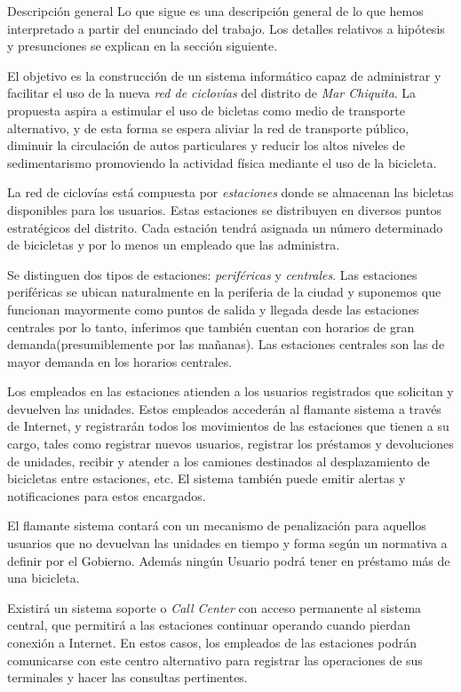  
%
%

\begin{subsection}{Descripción general}
Lo que sigue es una descripción general de lo que hemos interpretado a partir del enunciado del trabajo. Los detalles relativos a hipótesis y presunciones se explican en la sección siguiente.

El objetivo es la construcción de un sistema informático capaz de administrar y facilitar el uso de la nueva \emph{red de ciclovías} del distrito de \emph{Mar Chiquita}. La propuesta aspira a estimular el uso de bicletas como medio de transporte alternativo, y de esta forma se espera aliviar la red de transporte público, diminuir la circulación de autos particulares y reducir los altos niveles de sedimentarismo promoviendo la actividad física mediante el uso de la bicicleta.

La red de ciclovías está compuesta por \emph{estaciones} donde se almacenan las bicletas disponibles para los usuarios. Estas estaciones se distribuyen en diversos puntos estratégicos del distrito. Cada estación tendrá asignada un número determinado de bicicletas y por lo menos un empleado que las administra.

Se distinguen dos tipos de estaciones: \emph{periféricas} y \emph{centrales}. Las estaciones periféricas se ubican naturalmente en la periferia de la ciudad y suponemos que funcionan mayormente como puntos de salida y llegada desde las estaciones centrales por lo tanto, inferimos que también cuentan con horarios de gran demanda(presumiblemente por las mañanas). Las estaciones centrales son las de mayor demanda en los horarios centrales.

Los empleados en las estaciones atienden a los usuarios registrados que solicitan y devuelven las unidades. Estos empleados accederán al flamante sistema a través de Internet, y registrarán todos los movimientos de las estaciones que tienen a su cargo, tales como registrar nuevos usuarios, registrar los préstamos y devoluciones de unidades, recibir y atender a los camiones destinados al desplazamiento de bicicletas entre estaciones, etc. El sistema también puede emitir alertas y notificaciones para estos encargados.

El flamante sistema contará con un mecanismo de penalización para aquellos usuarios que no devuelvan las unidades en tiempo y forma según un normativa a definir por el Gobierno. Además ningún Usuario podrá tener en préstamo más de una bicicleta.

Existirá un sistema soporte o \emph{Call Center} con acceso permanente al sistema central, que permitirá a las estaciones continuar operando cuando pierdan conexión a Internet. En estos casos, los empleados de las estaciones podrán comunicarse con este centro alternativo para registrar las operaciones de sus terminales y hacer las consultas pertinentes.


\end{subsection}
